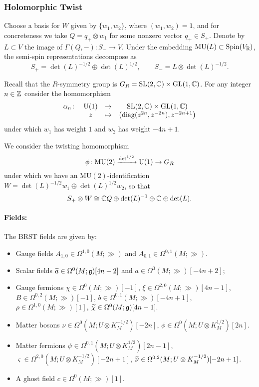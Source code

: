 \documentclass[10pt, oneside]{article}
\newcommand{\MU}{\mathrm{MU}}
\renewcommand{\U}{\mathrm{U}}
\begin{document}
\subsubsection{Holomorphic Twist}
\label{sect:4d_2_holomorphictwist}

Choose a basis for $W$ given by $\{w_1, w_2\}$, where $(w_1, w_2) = 1$, and for concreteness we take $Q=q_+ \otimes w_1$ for some nonzero vector $q_+ \in S_+$. Denote by $L\subset V$ the image of $\Gamma(Q, -)\colon S_-\rightarrow V$. Under the embedding $\MU(L) \subset \Spin(V_\RR)$, the semi-spin representations decompose as
\[
S_+ = \det(L)^{-1/2} \oplus \det(L)^{1/2},\qquad S_- = L \otimes \det(L)^{-1/2} .
\]

Recall that the $R$-symmetry group is $G_R = \SL(2, \CC) \times \GL(1, \CC)$. For any integer $n\in\ZZ$ consider the homomorphism 
\[
\begin{array}{ccccc}
\alpha_n \colon & \U(1) & \rightarrow & \SL(2, \CC)\times \GL(1, \CC)\\
&  z & \mapsto & \left({\rm diag}(z^{2n}, z^{-2n}) , z^{-2n+1} \right)
\end{array}
\]
under which $w_1$ has weight $1$ and $w_2$ has weight $-4n+1$.

We consider the twisting homomorphism 
\[
\phi \colon \MU(2) \xto{\det^{1/2}} \U(1) \rightarrow G_R
\]
under which we have an $\MU(2)$-identification $W=\det(L)^{-1/2}w_1 \oplus \det(L)^{1/2}w_2$, so that
\[S_+\otimes W\cong \CC Q\oplus \det(L)^{-1}\oplus \CC\oplus \det(L).\]

\vspace{-10pt}
\paragraph{Fields:} The BRST fields are given by:
\begin{itemize}
\item Gauge fields $A_{1, 0}\in\Omega^{1, 0}(M; \gg)$ and $A_{0, 1}\in\Omega^{0, 1}(M; \gg)$.
\item Scalar fields $\Tilde{a} \in \Omega^{0}(M; \gg)[4n-2]$ and $a \in\Omega^{0}(M; \gg)[-4n+2]$;
\item Gauge fermions $\chi \in \Omega^0(M ; \gg)[-1]$, $\xi \in \Omega^{2,0}(M ; \gg)[4n-1]$, $B \in \Omega^{0,2}(M ; \gg)[-1]$, $b \in \Omega^{0,1}(M ; \gg)[-4n+1]$, $\rho \in \Omega^{1,0}(M ; \gg)[1]$,  $\Tilde{\chi} \in \Omega^0(M ; \gg)[4n-1]$.
\item Matter bosons $\nu\in\Omega^0(M; U\otimes K_M^{-1/2})[-2n]$, $\phi\in\Omega^0(M; U\otimes K_M^{1/2})[2n]$.
\item Matter fermions $\psi \in \Omega^{0,1} (M ;  U\otimes K_M^{1/2})[2n-1]$, $\varsigma \in \Omega^{2,0} (M ; U\otimes K_M^{-1/2})[-2n+1]$, $\Tilde{\nu} \in \Omega^{0,2}(M ; U\otimes K_M^{-1/2})[-2n+1]$.
\item A ghost field $c\in \Omega^0(M; \gg)[1]$.
\end{itemize}
\end{document}
